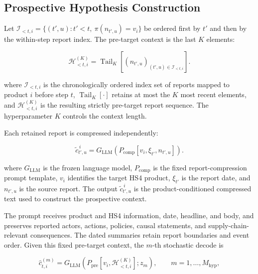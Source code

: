 \documentclass[letterpaper]{article} %
\begin{document}
\subsection{Prospective Hypothesis Construction}
\label{app:hypothesis-protocol}

Let \(\mathcal I_{<t,i}=\{(t',u):t'<t,\ \pi(n_{t',u})=v_i\}\) be ordered first by \(t'\) and then by the within-step report index. The pre-target context is the last \(K\) elements:

\begin{equation}
\mathcal H_{<t,i}^{(K)}
=
\operatorname{Tail}_K
\left[
(n_{t',u})_{(t',u)\in\mathcal I_{<t,i}}
\right].
\label{eq:app-event-history}
\end{equation}

where \(\mathcal I_{<t,i}\) is the chronologically ordered index set of reports mapped to product \(i\) before step \(t\), \(\operatorname{Tail}_K[\cdot]\) retains at most the \(K\) most recent elements, and \(\mathcal H_{<t,i}^{(K)}\) is the resulting strictly pre-target report sequence. The hyperparameter \(K\) controls the context length.

Each retained report is compressed independently:

\begin{equation}
\widetilde c_{t',u}^{\,i}
=
G_{\mathrm{LLM}}\!\left(
P_{\mathrm{comp}}[
v_i,\xi_{t'},n_{t',u}]
\right).
\label{eq:app-history-compression}
\end{equation}

where \(G_{\mathrm{LLM}}\) is the frozen language model, \(P_{\mathrm{comp}}\) is the fixed report-compression prompt template, \(v_i\) identifies the target HS4 product, \(\xi_{t'}\) is the report date, and \(n_{t',u}\) is the source report. The output \(\widetilde c_{t',u}^{\,i}\) is the product-conditioned compressed text used to construct the prospective context.

The prompt receives product and HS4 information, date, headline, and body, and preserves reported actors, actions, policies, causal statements, and supply-chain-relevant consequences. The dated summaries retain report boundaries and event order. Given this fixed pre-target context, the \(m\)-th stochastic decode is

\begin{equation}
\widehat c_{t,i}^{(m)}
=G_{\mathrm{LLM}}\!\left(
P_{\mathrm{pre}}[v_i,\mathcal H_{<t,i}^{(K)}];z_m
\right),
\qquad m=1,\ldots,M_{\mathrm{hyp}},
\label{eq:app-prospective-generation}
\end{equation}
\end{document}
